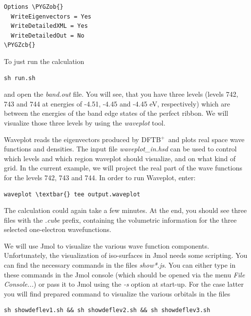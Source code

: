 \documentclass[a4paper,11pt,english]{sphinxmanual}
\newcommand{\dftbp}{\textsf{DFTB$^{\text{+}}$\ }} %
\def\PYGZob{\char`\{}
\def\PYGZcb{\char`\}}
\begin{document}
{{\begin{Verbatim}[commandchars=\\\{\}]
Options \PYGZob{}
  WriteEigenvectors = Yes
  WriteDetailedXML = Yes
  WriteDetailedOut = No
\PYGZcb{}
\end{Verbatim}

To just run the calculation

\begin{Verbatim}[commandchars=\\\{\}]
sh run.sh
\end{Verbatim}

and open the \emph{band.out} file. You will see, that you have three levels
(levels 742, 743 and 744 at energies of -4.51, -4.45 and -4.45 eV,
respectively) which are between the energies of the band edge states
of the perfect ribbon. We will visualize those three levels by using
the \emph{waveplot} tool.

Waveplot reads the eigenvectors produced by \dftbp and plots real space
wave functions and densities. The input file \emph{waveplot\_in.hsd} can be
used to control which levels and which region waveplot should
visualize, and on what kind of grid. In the current example, we will
project the real part of the wave functions for the levels 742, 743
and 744. In order to run Waveplot, enter:

\begin{Verbatim}[commandchars=\\\{\}]
waveplot \textbar{} tee output.waveplot
\end{Verbatim}

The calculation could again take a few minutes. At the end, you should
see three files with the \emph{.cube} prefix, containing the volumetric
information for the three selected one-electron wavefunctions.

We will use Jmol to visualize the various wave function
components. Unfortunately, the visualization of iso-surfaces in Jmol
needs some scripting. You can find the necessary commands in the files
\emph{show*.js}. You can either type in these commands in the Jmol console
(which should be opened via the menu \emph{File \textbar{} Console...}) or pass it
to Jmol using the \emph{-s} option at start-up. For the case latter you
will find prepared command to visualize the various orbitals in the
files

\begin{Verbatim}[commandchars=\\\{\}]
sh showdeflev1.sh && sh showdeflev2.sh && sh showdeflev3.sh
\end{Verbatim}

}}
\end{document}
